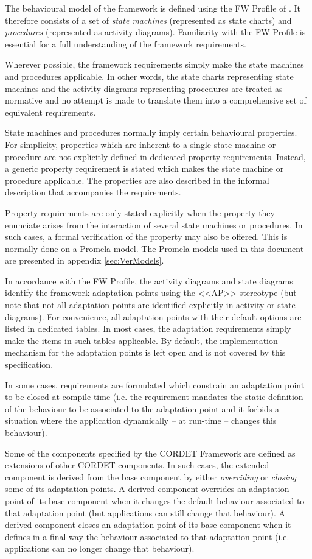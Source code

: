 \documentclass[a4paper,10pt]{article}
\begin{document}
The behavioural model of the framework is defined using the FW Profile of \cite{ref:fwprofile}. 
It therefore consists of a set of \textit{state machines} (represented as state charts) and \textit{procedures} (represented as  activity diagrams). 
Familiarity with the FW Profile is essential for a full understanding of the framework requirements.

Wherever possible, the framework requirements simply make the state machines and procedures applicable. In other words, the state charts representing state machines and the activity diagrams representing procedures are treated as normative and no attempt is made to translate them into a comprehensive set of equivalent requirements.

State machines and procedures normally imply certain behavioural properties. 
For simplicity, properties which are inherent to a single state machine or procedure are not explicitly defined in dedicated property requirements. 
Instead, a generic property requirement is stated which makes the state machine or procedure applicable. 
The properties are also described in the informal description that accompanies the requirements.

Property requirements are only stated explicitly when the property they enunciate arises from the interaction of several state machines or procedures. 
In such cases, a formal verification of the property may also be offered. 
This is normally done on a Promela model. 
The Promela models used in this document are presented in appendix \ref{sec:VerModels}.

In accordance with the FW Profile, the activity diagrams and state diagrams identify the framework adaptation points using the <<AP>> stereotype (but note that not all adaptation points are identified explicitly in activity or state diagrams). 
For convenience, all adaptation points with their default options are listed in dedicated tables. 
In most cases, the adaptation requirements simply make the items in such tables applicable. By default, the implementation mechanism for the adaptation points is left open and is not covered by this specification. 

In some cases, requirements are formulated which constrain an adaptation point to be closed at compile time (i.e. the requirement mandates the static definition of the behaviour to be associated to the adaptation point and it forbids a situation where the application dynamically – at run-time – changes this behaviour). 
 
Some of the components specified by the CORDET Framework are defined as extensions of other CORDET components. 
In such cases, the extended component is derived from the base component by either \textit{overriding} or \textit{closing} some of its adaptation points. 
A derived component overrides an adaptation point of its base component when it changes the default behaviour associated to that adaptation point (but applications can still change that behaviour). 
A derived component closes an adaptation point of its base component when it defines in a final way the behaviour associated to that adaptation point (i.e. applications can no longer change that behaviour).
\end{document}
